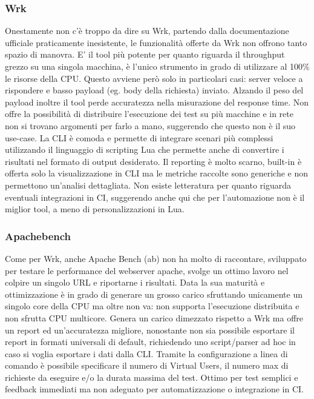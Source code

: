 \subsubsection{Wrk}
Onestamente non c’è troppo da dire su Wrk, partendo dalla documentazione ufficiale praticamente inesistente, le funzionalità offerte da Wrk non offrono tanto spazio di manovra.
E’ il tool più potente per quanto riguarda il throughput grezzo su una singola macchina, è l’unico strumento in grado di utilizzare al 100\% le risorse della CPU.
Questo avviene però solo in particolari casi: server veloce a rispondere e basso payload (eg. body della richiesta) inviato. Alzando il peso del payload inoltre il tool perde accuratezza nella misurazione del response time.
Non offre la possibilità di distribuire l’esecuzione dei test su più macchine e in rete non si trovano argomenti per farlo a mano, suggerendo che questo non è il suo use-case.
La CLI è comoda e permette di integrare scenari più complessi utilizzando il linguaggio di scripting Lua che permette anche di convertire i risultati nel formato di output desiderato.
Il reporting è molto scarno, built-in è offerta solo la visualizzazione in CLI ma le metriche raccolte sono generiche e non permettono un’analisi dettagliata.
Non esiste letteratura per quanto riguarda eventuali integrazioni in CI, suggerendo anche qui che per l’automazione non è il miglior tool, a meno di personalizzazioni in Lua.
\subsubsection{Apachebench}
Come per Wrk, anche Apache Bench (ab) non ha molto di raccontare, sviluppato per testare le performance del webserver apache, svolge un ottimo lavoro nel colpire un singolo URL e riportarne i risultati.
Data la sua maturità e ottimizzazione è in grado di generare un grosso carico sfruttando unicamente un singolo core della CPU ma oltre non va: non supporta l’esecuzione distribuita e non sfrutta CPU multicore.
Genera un carico dimezzato rispetto a Wrk ma offre un report ed un’accuratezza migliore, nonostante non sia possibile esportare il report in formati universali di default, richiedendo uno script/parser ad hoc in caso si voglia esportare i dati dalla CLI.
Tramite la configurazione a linea di comando è possibile specificare il numero di Virtual Users, il numero max di richieste da eseguire e/o la durata massima del test.
Ottimo per test semplici e feedback immediati ma non adeguato per automatizzazione o integrazione in CI.
